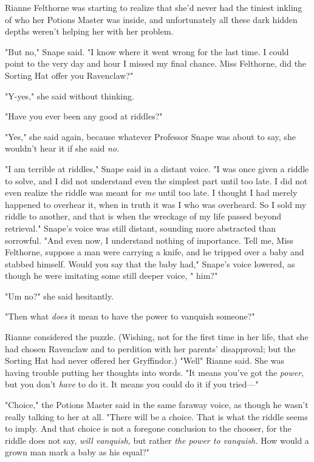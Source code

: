 Rianne Felthorne was starting to realize that she'd never had the tiniest
inkling of who her Potions Master was inside, and unfortunately all these dark
hidden depths weren't helping her with her problem.

"But no," Snape said. "I know where it went wrong for the last time. I could
point to the very day and hour I missed my final chance. Miss Felthorne, did
the Sorting Hat offer you Ravenclaw?"

"Y-yes," she said without thinking.

"Have you ever been any good at riddles?"

"Yes," she said again, because whatever Professor Snape was about to say, she
wouldn't hear it if she said \emph{no.}

"I am terrible at riddles," Snape said in a distant voice. "I was once given a
riddle to solve, and I did not understand even the simplest part until too
late. I did not even realize the riddle was meant for \emph{me} until too late.
I thought I had merely happened to overhear it, when in truth it was I who was
overheard. So I sold my riddle to another, and that is when the wreckage of my
life passed beyond retrieval." Snape's voice was still distant, sounding more
abstracted than sorrowful. "And even now, I understand nothing of importance.
Tell me, Miss Felthorne, suppose a man were carrying a knife, and he tripped
over a baby and stabbed himself. Would you say that the baby had," Snape's
voice lowered, as though he were imitating some still deeper voice, " him?"

"Um{\el} no?" she said hesitantly.

"Then what \emph{does} it mean to have the power to vanquish someone?"

Rianne considered the puzzle. (Wishing, not for the first time in her life,
that she had chosen Ravenclaw and to perdition with her parents' disapproval;
but the Sorting Hat had never offered her Gryffindor.) "Well{\el}" Rianne
said. She was having trouble putting her thoughts into words. "It means you've
got the \emph{power}, but you don't \emph{have} to do it. It means you could do
it if you tried—"

"Choice," the Potions Master said in the same faraway voice, as though he
wasn't really talking to her at all. "There will be a choice. That is what the
riddle seems to imply. And that choice is not a foregone conclusion to the
chooser, for the riddle does not say, \emph{will vanquish,} but rather
\emph{the power to vanquish.} How would a grown man mark a baby as his equal?"

